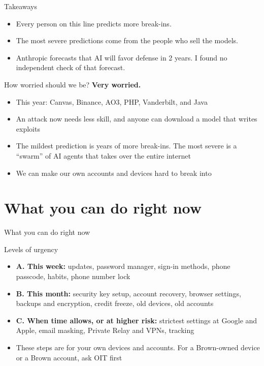 \documentclass[11pt]{beamer}
\newcommand{\lvl}[1]{\textcolor{brownred}{\textbf{#1}}}
\begin{document}
\begin{frame}{Takeaways}
\vfill
\pause
\begin{itemize}\setlength\itemsep{14pt}
\item Every person on this line predicts more break-ins. \pause
\item The most severe predictions come from the people who sell the models. \pause
\item Anthropic forecasts that AI will favor defense in 2 years. I found no independent check of that forecast.
\end{itemize}
\vfill
\end{frame}


\begin{frame}{How worried should we be?}
\vfill
\pause
{\Large\textbf{Very worried.}}\par
\vfill
\pause
\begin{itemize}\setlength\itemsep{10pt}
\item This year: Canvas, Binance, AO3, PHP, Vanderbilt, and Java \pause
\item An attack now needs less skill, and anyone can download a model that writes exploits \pause
\item The mildest prediction is years of more break-ins. The most severe is a ``swarm'' of AI agents that takes over the entire internet \pause
\item[$\rightarrow$] We can make our own accounts and devices hard to break into
\end{itemize}
\vfill
\end{frame}


\section{What you can do right now}

\begin{transition}{}{What you can do right now}
\end{transition}


\begin{frame}{Levels of urgency}
\pause
\begin{itemize}\setlength\itemsep{12pt}
\item \lvl{A. This week:} updates, password manager, sign-in methods, phone passcode, habits, phone number lock \pause
\item \lvl{B. This month:} security key setup, account recovery, browser settings, backups and encryption, credit freeze, old devices, old accounts \pause
\item \lvl{C. When time allows, or at higher risk:} strictest settings at Google and Apple, email masking, Private Relay and VPNs, tracking \pause
\item These steps are for your own devices and accounts. For a Brown-owned device or a Brown account, ask OIT first
\end{itemize}
\end{frame}
\end{document}
